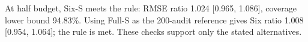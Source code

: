 At half budget, Six-S meets the rule: RMSE ratio 1.024 [0.965, 1.086], coverage lower bound 94.83\%. Using Full-S as the 200-audit reference gives Six ratio 1.008 [0.954, 1.064]; the rule is met. These checks support only the stated alternatives.
